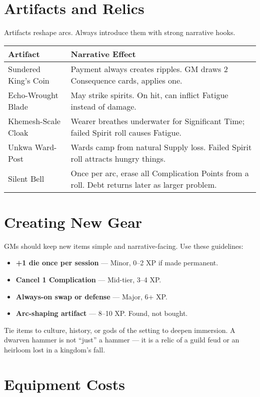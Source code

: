 \documentclass[12pt]{book}
\begin{document}
\section{Artifacts and Relics}
Artifacts reshape arcs. Always introduce them with strong narrative hooks.

\begin{tabularx}{\textwidth}{lX}
\textbf{Artifact} & \textbf{Narrative Effect} \\
\hline
Sundered King’s Coin & Payment always creates ripples. GM draws 2 Consequence cards, applies one. \\
Echo-Wrought Blade & May strike spirits. On hit, can inflict Fatigue instead of damage. \\
Khemesh-Scale Cloak & Wearer breathes underwater for Significant Time; failed Spirit roll causes Fatigue. \\
Unkwa Ward-Post & Wards camp from natural Supply loss. Failed Spirit roll attracts hungry things. \\
Silent Bell & Once per arc, erase all Complication Points from a roll. Debt returns later as larger problem. \\
\end{tabularx}

\section{Creating New Gear}
GMs should keep new items simple and narrative-facing. Use these guidelines:
\begin{itemize}
  \item \textbf{+1 die once per session} — Minor, 0–2 XP if made permanent.  
  \item \textbf{Cancel 1 Complication} — Mid-tier, 3–4 XP.  
  \item \textbf{Always-on swap or defense} — Major, 6+ XP.  
  \item \textbf{Arc-shaping artifact} — 8–10 XP. Found, not bought.  
\end{itemize}

Tie items to culture, history, or gods of the setting to deepen immersion.  
A dwarven hammer is not “just” a hammer — it is a relic of a guild feud or an heirloom lost in a kingdom’s fall.

\section{Equipment Costs}
\end{document}
